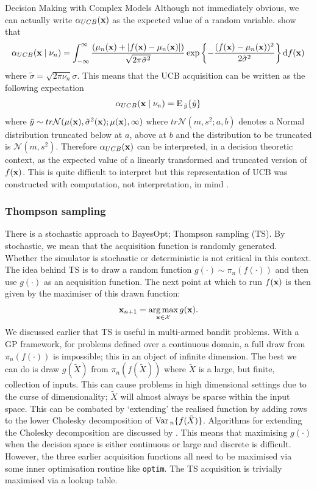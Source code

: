 \begin{chapter}{Decision Making with Complex Models \label{Chap:optimisation}}
Although not immediately obvious, we can actually write $\alpha_{UCB}(\mathbf{x})$ as the expected value of a random variable. \citet{JamesWilson2018} show that
\begin{equation}
 \alpha_{UCB}(\mathbf{x} \mid \nu_n) = \int_{-\infty}^{\infty}\frac{\left( \mu_n(\mathbf{x}) + |f(\mathbf{x}) - \mu_n(\mathbf{x})| \right)}{\sqrt{2 \pi \tilde{\sigma}^2}} \exp \left\{ -\frac{(f(\mathbf{x}) - \mu_n(\mathbf{x}))^2}{2 \tilde{\sigma}^2} \right\} \text{d} f(\mathbf{x})
\end{equation}
where $\tilde{\sigma} = \sqrt{2 \pi \nu_n} \sigma$. This means that the UCB acquisition can be written as the following expectation
\begin{equation}
  \alpha_{UCB}(\mathbf{x} \mid \nu_n) =\textrm{E}\,_{\tilde{y}} \{\tilde{y}\}
\end{equation}
where $\tilde{y} \sim tr\mathcal{N}(\mu(\mathbf{x}), \tilde{\sigma}^2(\mathbf{x}); \mu(\mathbf{x}), \infty)$ where $tr\mathcal{N}(m, s^2; a, b)$ denotes a Normal distribution truncated below at $a$, above at $b$ and the distribution to be truncated is $\mathcal{N}(m ,s^2)$. Therefore $\alpha_{UCB}(\mathbf{x})$ can be interpreted, in a decision theoretic context, as the expected value of a linearly transformed and truncated version of $f(\mathbf{x})$. This is quite difficult to interpret but this representation of UCB was constructed with computation, not interpretation, in mind \citep{Wilson2017}.
\subsubsection{Thompson sampling}
There is a stochastic approach to BayesOpt; Thompson sampling (TS). By stochastic, we mean that the acquisition function is randomly generated. Whether the simulator is stochastic or deterministic is not critical in this context. The idea behind TS is to draw a random function $g(\cdot) \sim \pi_n(f(\cdot))$ and then use $g(\cdot)$ as an acquisition function. The next point at which to run $f(\mathbf{x})$ is then given by the maximiser of this drawn function:
\begin{equation}
 \mathbf{x}_{n+1} = \operatorname*{arg\,max}_{\mathbf{x} \in \mathcal{X}} g(\mathbf{x}).
\end{equation}
We discussed earlier that TS is useful in multi-armed bandit problems. With a GP framework, for problems defined over a continuous domain, a full draw from $\pi_n(f(\cdot))$ is impossible; this in an object of infinite dimension. The best we can do is draw $g(\tilde{X})$ from $\pi_n(f(\tilde{X}))$ where $\tilde{X}$ is a large, but finite, collection of inputs. This can cause problems in high dimensional settings due to the curse of dimensionality; $\tilde{X}$ will almost always be sparse within the input space. This can be combated by `extending' the realised function by adding rows to the lower Cholesky decomposition of $\mathrm{Var}\,_n \{ f(\tilde{X}) \}$. Algorithms for extending the Cholesky decomposition are discussed by \citet{Higham2009}. This means that maximising $g(\cdot)$ when the decision space is either continuous or large and discrete is difficult. However, the three earlier acquisition functions all need to be maximised via some inner optimisation routine like \verb|optim|. The TS acquisition is trivially maximised via a lookup table.


\end{chapter}
